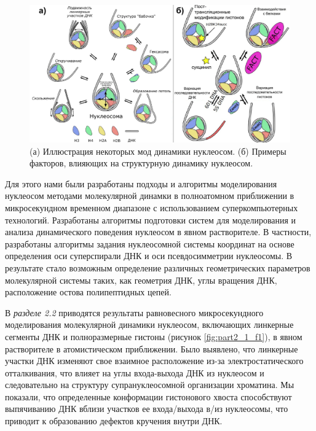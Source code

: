\begin{figure} [h!]
    \centering
    \includegraphics [width=\textwidth]{images/p2/cosb/part2_1_f2_synopsis.pdf}
    \caption[Моды динамики нуклеосом]{(а) Иллюстрация некоторых мод динамики нуклеосом. (б) Примеры факторов, влияющих на структурную динамику нуклеосом.}
    \label{fig:part2_1_f2}
\end{figure}

Для этого нами были разработаны подходы и алгоритмы моделирования нуклеосом методами молекулярной динамки в полноатомном приближении в микросекундном временном диапазоне с использованием суперкомпьютерных технологий. Разработаны алгоритмы подготовки систем для моделирования и анализа динамического поведения нуклеосом в явном растворителе. В частности, разработаны алгоритмы задания нуклеосомной системы координат на основе определения оси суперспирали ДНК и оси псевдосимметрии нуклеосомы. В результате стало возможным определение различных геометрических параметров молекулярной системы таких, как геометрия ДНК, углы вращения ДНК, расположение остова полипептидных цепей.
  

В \textit{разделе 2.2} приводятся результаты равновесного микросекундного моделирования молекулярной динамики нуклеосом, включающих линкерные сегменты ДНК и полноразмерные гистоны (рисунок \ref{fig:part2_1_f1}), в явном растворителе в атомистическом приближении.
Было выявлено, что линкерные участки ДНК изменяют свое взаимное расположение из-за электростатического отталкивания, что влияет на углы входа-выхода ДНК из нуклеосом и следовательно на структуру супрануклеосомной организации хроматина. Мы показали, что определенные конформации гистонового хвоста способствуют выпячиванию ДНК вблизи участков ее входа/выхода в/из нуклеосомы, что приводит к образованию дефектов кручения внутри ДНК. 


